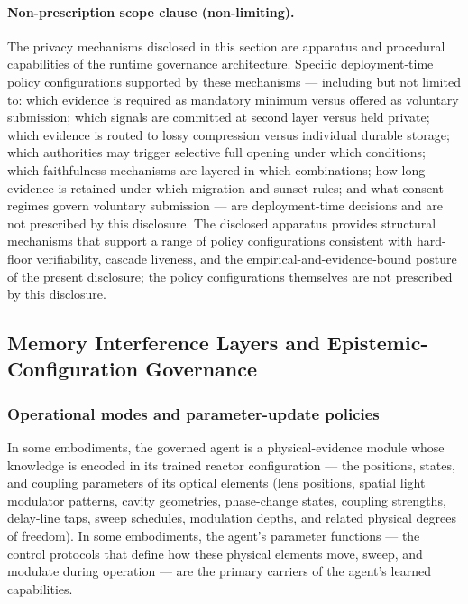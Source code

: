\documentclass[a4paper,12pt]{article}
\begin{document}
\paragraph{Non-prescription scope clause (non-limiting).}
The privacy mechanisms disclosed in this section are apparatus and
procedural capabilities of the runtime governance architecture.
Specific deployment-time policy configurations supported by these
mechanisms --- including but not limited to: which evidence is
required as mandatory minimum versus offered as voluntary
submission; which signals are committed at second layer versus held
private; which evidence is routed to lossy compression versus
individual durable storage; which authorities may trigger selective
full opening under which conditions; which faithfulness mechanisms
are layered in which combinations; how long evidence is retained
under which migration and sunset rules; and what consent regimes
govern voluntary submission --- are deployment-time decisions and
are not prescribed by this disclosure. The disclosed apparatus
provides structural mechanisms that support a range of policy
configurations consistent with hard-floor verifiability, cascade
liveness, and the empirical-and-evidence-bound posture of the
present disclosure; the policy configurations themselves are not
prescribed by this disclosure.

\subsection{Memory Interference Layers and Epistemic-Configuration
  Governance}
\label{sec:kosha-architecture}


\subsubsection{Operational modes and parameter-update policies}


In some embodiments, the governed agent is a physical-evidence module
whose knowledge is encoded in its trained reactor configuration ---
the positions, states, and coupling parameters of its optical
elements (lens positions, spatial light modulator patterns, cavity
geometries, phase-change states, coupling strengths, delay-line taps,
sweep schedules, modulation depths, and related physical degrees of
freedom). In some embodiments, the agent's parameter functions ---
the control protocols that define how these physical elements move,
sweep, and modulate during operation --- are the primary carriers of
the agent's learned capabilities.
\end{document}
